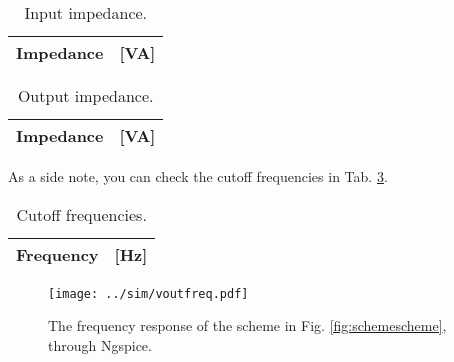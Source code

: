 \begin{table}[H]
    \centering
    \begin{tabular}{|c|c|}
    	\hline
    	Impedance & [VA]\\ 
    	\hline
         
    \end{tabular}
    \caption{Input impedance.}
    \label{tab:inputimp}
\end{table}

\begin{table}[H]
    \centering
    \begin{tabular}{|c|c|}
    	\hline
    	Impedance & [VA]\\ 
    	\hline
         
    \end{tabular}
    \caption{Output impedance.}
    \label{tab:outputimp}
\end{table}

As a side note, you can check the cutoff frequencies in Tab. \ref{tab:cutoff}.

\begin{table}[H]
    \centering
    \begin{tabular}{|c|c|}
        \hline
        Frequency & [Hz]\\ 
        \hline
         
    \end{tabular}
    \caption{Cutoff frequencies.}
    \label{tab:cutoff}
\end{table}

\begin{figure}[H]
    \centering
    \texttt{[image: ../sim/voutfreq.pdf]}
    \caption{The frequency response of the scheme in Fig. \ref{fig:schemescheme}, through Ngspice.}
    \label{fig:ngresp}
\end{figure}